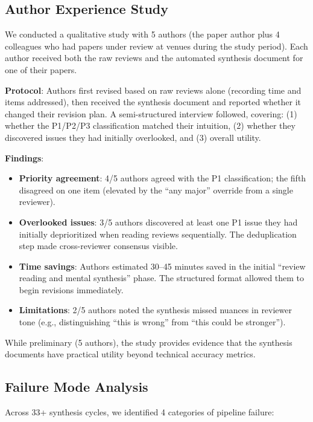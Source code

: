 \subsection{Author Experience Study}

We conducted a qualitative study with 5 authors (the paper author plus 4 colleagues who had papers under review at venues during the study period). Each author received both the raw reviews and the automated synthesis document for one of their papers.

\textbf{Protocol}: Authors first revised based on raw reviews alone (recording time and items addressed), then received the synthesis document and reported whether it changed their revision plan. A semi-structured interview followed, covering: (1) whether the P1/P2/P3 classification matched their intuition, (2) whether they discovered issues they had initially overlooked, and (3) overall utility.

\textbf{Findings}:
\begin{itemize}
    \item \textbf{Priority agreement}: 4/5 authors agreed with the P1 classification; the fifth disagreed on one item (elevated by the ``any major'' override from a single reviewer).
    \item \textbf{Overlooked issues}: 3/5 authors discovered at least one P1 issue they had initially deprioritized when reading reviews sequentially. The deduplication step made cross-reviewer consensus visible.
    \item \textbf{Time savings}: Authors estimated 30--45 minutes saved in the initial ``review reading and mental synthesis'' phase. The structured format allowed them to begin revisions immediately.
    \item \textbf{Limitations}: 2/5 authors noted the synthesis missed nuances in reviewer tone (e.g., distinguishing ``this is wrong'' from ``this could be stronger'').
\end{itemize}

While preliminary (5 authors), the study provides evidence that the synthesis documents have practical utility beyond technical accuracy metrics.

\subsection{Failure Mode Analysis}
\label{sec:failure-modes}

Across 33+ synthesis cycles, we identified 4 categories of pipeline failure:

